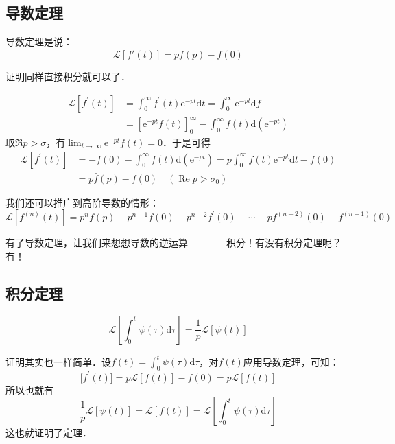 \subsection{导数定理}

导数定理是说：
\begin{equation}
\mathscr L[f'(t)]=p\bar f(p)-f(0)
\end{equation}

证明同样直接积分就可以了．

\begin{equation}
\begin{aligned} \mathscr L[f^{\prime}(t)] & = \int_{0}^{\infty} f^{\prime}(t) \mathrm{e}^{-p t} \mathrm{d} t=\int_{0}^{\infty} \mathrm{e}^{-p t} \mathrm{d} f \\ &=\left[\mathrm{e}^{-p t} f(t)\right]_{0}^{\infty}-\int_{0}^{\infty} f(t) \mathrm{d}\left(\mathrm{e}^{-p t}\right) \end{aligned}
\end{equation}
取$\Re p>\sigma$，有$\lim_{t\to\infty}\mathrm{e}^{-pt}f(t)=0$．于是可得
\begin{equation}
\begin{aligned} \mathscr L[f^{\prime}(t)] & = -f(0)-\int_{0}^{\infty} f(t) \mathrm{d}\left(\mathrm{e}^{-\rho t}\right)=p \int_{0}^{\infty} f(t) \mathrm{e}^{-p t} \mathrm{d} t-f(0) \\ &=p \bar{f}(p)-f(0) \quad\left(\operatorname{Re} p>\sigma_{0}\right) \end{aligned}
\end{equation}

我们还可以推广到高阶导数的情形：
\begin{equation}
\mathscr L[f^{(n)}(t)] = p^{n} f(p)-p^{n-1} f(0)-p^{n-2} f^{\prime}(0)-\cdots-p f^{(n-2)}(0)-f^{(n-1)}(0)
\end{equation} 

有了导数定理，让我们来想想导数的逆运算————积分！有没有积分定理呢？有！

\subsection{积分定理}
\begin{equation}
\mathscr L\left[\int_{0}^{t} \psi(\tau) \mathrm{d} \tau \right]=\frac{1}{p} \mathscr{L}[\psi(t)]
\end{equation}

证明其实也一样简单．设$\displaystyle f(t)=\int_{0}^{t} \psi(\tau) \mathrm{d} \tau$，对$f(t)$应用导数定理，可知：
\begin{equation}
\mathscr[f^{\prime}(t)]=p \mathscr{L}[f(t)]-f(0)=p \mathscr{L}[f(t)]
\end{equation}
所以也就有
\begin{equation}
\frac{1}{p} \mathscr{L}[\psi(t)]=\mathscr{L}[f(t)]=\mathscr{L}\left[\int_{0}^{t} \psi(\tau) \mathrm{d} \tau\right]
\end{equation}
这也就证明了定理．
 
